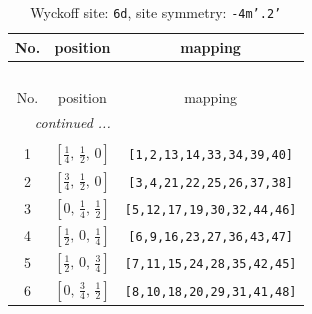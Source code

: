 \documentclass[fleqn,8pt]{jsarticle}
\begin{document}
\begin{longtable}{ccc}
\caption{Wyckoff site: {\tt 6d}, site symmetry: {\tt -4m'.2'}}
 \\
 \hline \hline
No. & position & mapping \\ \hline \endfirsthead

\multicolumn{2}{l}{\tablename\ \thetable{}} \\
 \hline \hline
No. & position & mapping \\ \hline \endhead

 \hline \hline
\multicolumn{2}{r}{\footnotesize\it continued ...} \\ \endfoot

 \hline \hline
\multicolumn{2}{r}{} \\ \endlastfoot

1 & $\left[ \frac{1}{4},\, \frac{1}{2},\, 0 \right]$ & {\tt [1,2,13,14,33,34,39,40]} \\ \hline
2 & $\left[ \frac{3}{4},\, \frac{1}{2},\, 0 \right]$ & {\tt [3,4,21,22,25,26,37,38]} \\ \hline
3 & $\left[ 0,\, \frac{1}{4},\, \frac{1}{2} \right]$ & {\tt [5,12,17,19,30,32,44,46]} \\ \hline
4 & $\left[ \frac{1}{2},\, 0,\, \frac{1}{4} \right]$ & {\tt [6,9,16,23,27,36,43,47]} \\ \hline
5 & $\left[ \frac{1}{2},\, 0,\, \frac{3}{4} \right]$ & {\tt [7,11,15,24,28,35,42,45]} \\ \hline
6 & $\left[ 0,\, \frac{3}{4},\, \frac{1}{2} \right]$ & {\tt [8,10,18,20,29,31,41,48]} \\
\end{longtable}
\renewcommand{\arraystretch}{1.2}
\end{document}
